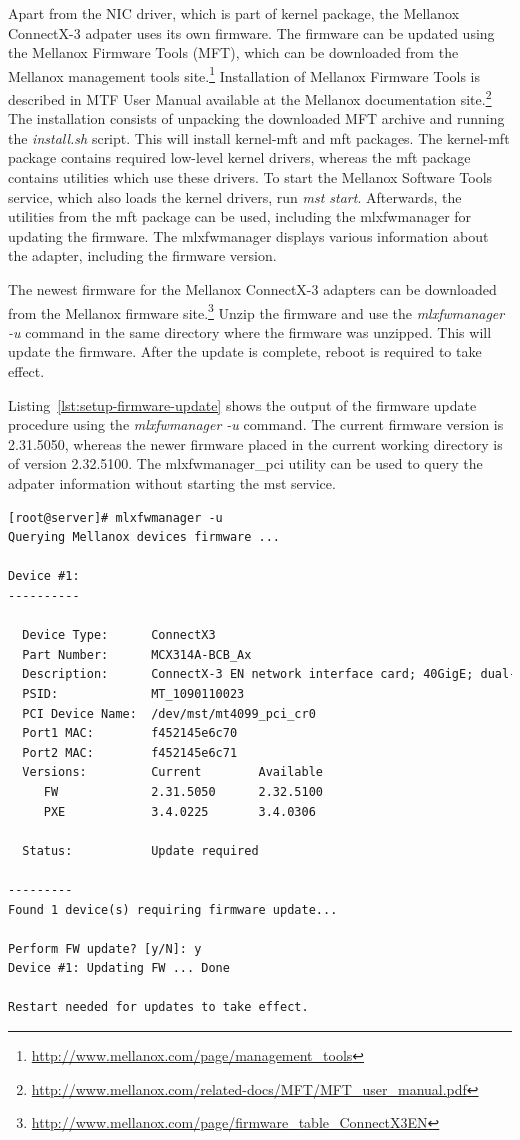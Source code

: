 Apart from the NIC driver, which is part of kernel package, the Mellanox ConnectX-3 adpater uses its own firmware.
The firmware can be updated using the Mellanox Firmware Tools (MFT), which can be downloaded
from the Mellanox management tools site.\footnote{{\url{http://www.mellanox.com/page/management_tools}}}
Installation of Mellanox Firmware Tools is described in MTF User Manual available at
the Mellanox documentation site.\footnote{{\url{http://www.mellanox.com/related-docs/MFT/MFT_user_manual.pdf}}}
The installation consists of unpacking the downloaded MFT archive and running the {\it{install.sh}} script.
This will install kernel-mft and mft packages.
The kernel-mft package contains required low-level kernel drivers, whereas the mft package contains utilities which use these drivers.
To start the Mellanox Software Tools service, which also loads the kernel drivers, run {\it{mst start}}.
Afterwards, the utilities from the mft package can be used, including the mlxfwmanager for updating the firmware.
The mlxfwmanager displays various information about the adapter, including the firmware version.

The newest firmware for the Mellanox ConnectX-3 adapters can be downloaded
from the Mellanox firmware site.\footnote{{\url{http://www.mellanox.com/page/firmware_table_ConnectX3EN}}}
Unzip the firmware and use the {\it{mlxfwmanager -u}} command in the same directory where the firmware was unzipped.
This will update the firmware.
After the update is complete, reboot is required to take effect.

Listing~\ref{lst:setup-firmware-update} shows the output of the firmware update procedure using the {\it{mlxfwmanager -u}} command.
The current firmware version is 2.31.5050, whereas the newer firmware placed in the current working directory is of version 2.32.5100.
The mlxfwmanager\_pci utility can be used to query the adpater information without starting the mst service.
\begin{lstlisting}[language=TeX,label={lst:setup-firmware-update}]
[root@server]# mlxfwmanager -u
Querying Mellanox devices firmware ...

Device #1:
----------

  Device Type:      ConnectX3
  Part Number:      MCX314A-BCB_Ax
  Description:      ConnectX-3 EN network interface card; 40GigE; dual-port QSFP; PCIe3.0 x8 8GT/s; RoHS R6
  PSID:             MT_1090110023
  PCI Device Name:  /dev/mst/mt4099_pci_cr0
  Port1 MAC:        f452145e6c70
  Port2 MAC:        f452145e6c71
  Versions:         Current        Available     
     FW             2.31.5050      2.32.5100     
     PXE            3.4.0225       3.4.0306      

  Status:           Update required

---------
Found 1 device(s) requiring firmware update...

Perform FW update? [y/N]: y
Device #1: Updating FW ... Done

Restart needed for updates to take effect.
\end{lstlisting}

